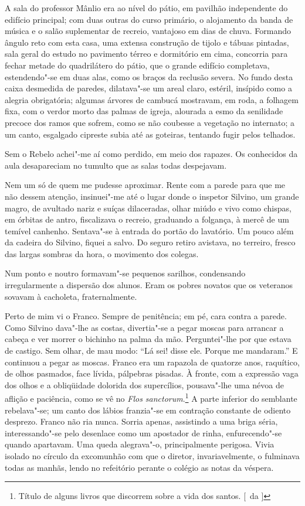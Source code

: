A sala do professor Mânlio era ao nível do
pátio, em pavilhão independente do edifício principal; com duas outras
do curso primário, o alojamento da banda de música e o salão
suplementar de recreio, vantajoso em dias de chuva. Formando ângulo reto com 
esta casa, uma extensa construção de tijolo e tábuas pintadas, sala geral do
estudo no pavimento térreo e dormitório em cima, concorria para fechar
metade do quadrilátero do pátio, que o grande edifício completava,
estendendo"-se em duas alas, como os braços da reclusão severa. No
fundo desta caixa desmedida de paredes, dilatava"-se um areal claro,
estéril, insípido como a alegria obrigatória; algumas árvores de
cambucá mostravam, em roda, a folhagem fixa, com o verdor morto das
palmas de igreja, alourada a esmo da senilidade precoce dos ramos que
sofrem, como se não coubesse a vegetação no internato; a um canto,
esgalgado cipreste subia até as goteiras, tentando fugir pelos telhados. 

Sem o Rebelo achei"-me aí como perdido, em meio dos rapazes.
Os conhecidos da aula desapareciam no tumulto que as salas todas despejavam. 

Nem um só de quem me pudesse aproximar. Rente com a parede
para que me não dessem atenção, insinuei"-me até o lugar donde o
inspetor Silvino, um grande magro, de avultado nariz e suíças
dilaceradas, olhar miúdo e vivo como chispas, em órbitas de antro,
fiscalizava o recreio, graduando a folgança, à mercê de um temível
canhenho. Sentava"-se à entrada do portão do lavatório. Um pouco além
da cadeira do Silvino, fiquei a salvo. Do seguro retiro avistava, no
terreiro, fresco das largas sombras da hora, o movimento dos colegas.

Num ponto e noutro formavam"-se pequenos sarilhos, condensando
irregularmente a dispersão dos alunos. Eram os pobres novatos que os
veteranos sovavam à cacholeta, fraternalmente. 

Perto de mim vi o Franco. Sempre de penitência; em pé, cara contra a parede. 
Como Silvino dava"-lhe as costas, divertia"-se a pegar moscas para arrancar a
cabeça e ver morrer o bichinho na palma da mão. Perguntei"-lhe por que
estava de castigo. Sem olhar, de mau modo: ``Lá sei! disse ele. Porque
me mandaram.'' E continuou a pegar as moscas. Franco era um rapazola de
quatorze anos, raquítico, de olhos pasmados, face lívida, pálpebras
pisadas. À fronte, com a expressão vaga dos olhos e a obliqüidade
dolorida dos supercílios, pousava"-lhe uma névoa de aflição e
paciência, como se vê no \textit{Flos sanctorum}.\footnote{ Título de alguns 
livros que discorrem sobre a vida dos santos. [~da ]} A parte inferior do semblante
rebelava"-se; um canto dos lábios franzia"-se em contração constante
de odiento desprezo. Franco não ria nunca. Sorria apenas, assistindo a
uma briga séria, interessando"-se pelo desenlace como um apostador de
rinha, enfurecendo"-se quando apartavam. Uma queda alegrava"-o,
principalmente perigosa. Vivia isolado no círculo da excomunhão com que
o diretor, invariavelmente, o fulminava todas as manhãs, lendo no
refeitório perante o colégio as notas da véspera. 

